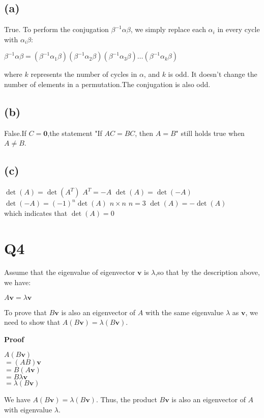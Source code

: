 \documentclass[12pt]{article}
\begin{document}
	\subsection*{(a)}
		True. To perform the conjugation $\beta^{-1} \alpha \beta$, we simply replace each $\alpha_i$ in every cycle with $\alpha_i \beta$:
		\begin{center}
			$\beta^{-1} \alpha \beta = (\beta^{-1} \alpha_1 \beta) (\beta^{-1} \alpha_2 \beta) (\beta^{-1} \alpha_3 \beta) \ldots (\beta^{-1} \alpha_k \beta)$
		\end{center}
		where $k$ represents the number of cycles in $\alpha$, and $k$ is odd.
		It doesn't change the number of elements in a permutation.The conjugation is also odd.
	\subsection*{(b)}
		False.If $C = \textbf{0}$,the statement "If $AC = BC$, then $A = B$" still holds true when $A \neq B$.
	\subsection*{(c)}
		 \(\det(A) = \det(A^T)\) \(A^T = -A\) \(\det(A) = \det(-A)\) \(\det(-A) = (-1)^n \det(A)\)  \(n \times n\)  \(n = 3\)  \(\det(A) = -\det(A)\)\
		\\ which indicates that  \(\det(A) = 0\)

\section{Q4}
	Assume that the eigenvalue of eigenvector $\textbf{v}$ is $\lambda$,so that by the description above, we have:
	\begin{center}
		$A \textbf{v} = \lambda \textbf{v}$
	\end{center}
	To prove that \(B\mathbf{v}\) is also an eigenvector of \(A\) with the same eigenvalue \(\lambda\) as \(\mathbf{v}\), we need to show that \(A(B\mathbf{v}) = \lambda (B\mathbf{v})\).

	\textbf{Proof}
	\begin{center}
		$A(B\textbf{v})$\\
		$=(AB)\textbf{v}$\\
		$=B(A\textbf{v})$\\
		$=B\lambda \textbf{v}$\\
		$= \lambda (B\textbf{v})$\\
	\end{center}
	We have \(A(B\mathbf{v}) = \lambda (B\mathbf{v})\). Thus, the product \(B\mathbf{v}\) is also an eigenvector of \(A\) with eigenvalue \(\lambda\).
\end{document}

